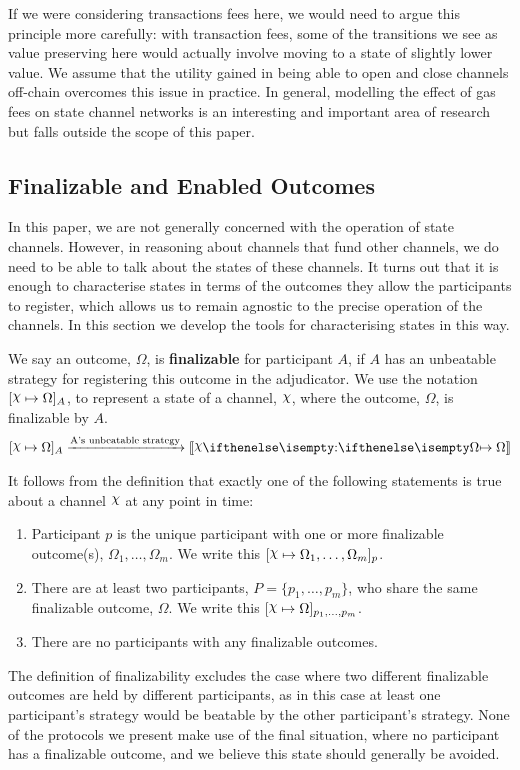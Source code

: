 \documentclass{article}
\begin{document}
If we were considering transactions fees here, we would need to argue this principle more
carefully: with transaction fees, some of the transitions we see as value preserving here
would actually involve moving to a state of slightly lower value. 
We assume that the utility gained in being able to open and close channels off-chain overcomes
this issue in practice.
In general, modelling the effect of gas fees on state channel networks is an interesting and important area of research but falls outside the scope of this paper.

\subsection{Finalizable and Enabled Outcomes}

In this paper, we are not generally concerned with the operation of state channels.
However, in reasoning about channels that fund other channels, we do need to be able to talk about the states of these channels.
It turns out that it is enough to characterise states in terms of the outcomes they allow the participants to register, which allows us to remain agnostic to the precise operation of the channels.
In this section we develop the tools for characterising states in this way.

We say an outcome, $\Omega$, is \textbf{finalizable} for participant $A$, if $A$ has an unbeatable
strategy for registering this outcome in the adjudicator.
We use the notation $\finalizable{\rchi}{\Omega}{A}$, to represent a state of a channel, $\rchi$,
where the outcome, $\Omega$, is finalizable by $A$.
\begin{align}
  \finalizable{\rchi}{\Omega}{A} \xrightarrow{\text{A's unbeatable strategy}} \adj{\holds{\rchi}{}{\Omega}}
\end{align}

It follows from the definition that exactly one of the following statements is true about
a channel $\rchi$ at any point in time:
\begin{enumerate}
  \item Participant $p$ is the unique participant with one or more finalizable outcome(s), $\Omega_1, \dots, \Omega_m$.
        We write this $\finalizable{\rchi}{\Omega_1, \dots, \Omega_m}{p}$.
  \item There are at least two participants, $P = \{p_1, \dots, p_m \}$, who share the same
        finalizable outcome, $\Omega$. We write this $\finalizable{\rchi}{\Omega}{p_1, \dots, p_m}$.
  \item There are no participants with any finalizable outcomes.
\end{enumerate}
The definition of finalizability excludes the case where two different finalizable outcomes are held
by different participants, as in this case at least one participant's strategy would be beatable
by the other participant's strategy.
None of the protocols we present make use of the final situation, where no participant has a finalizable outcome, and we believe this state should generally be avoided.
\end{document}
